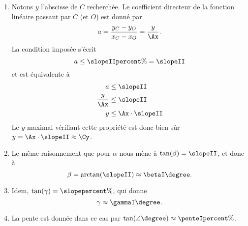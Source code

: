 {\begin{enumerate}
		\item 
		Notons $y$ l'abscisse de $C$ recherchée.
		Le coefficient directeur de la fonction linéaire passant par $C$ (et $O$) est donné par
			\[ a = \dfrac{y_C-y_O}{x_C-x_O} = \dfrac{y}{\Ax}. \]
		La condition imposée s'écrit
			\[ a \leq \slopeIIpercent\% = \slopeII \]
		et est équivalente à
			\begin{align*}
				a &\leq \slopeII \\
				\dfrac{y}{\Ax} &\leq \slopeII \\
				y &\leq \Ax \cdot \slopeII
			\end{align*}
		Le $y$ maximal vérifiant cette propriété est donc bien sûr $y=\Ax \cdot \slopeII \approx \Cy$.
		
		
		
		\item		
		Le même raisonnement que pour $\alpha$ nous mène à $\tan(\beta) = \slopeII$, et donc à
			\[ \beta = \arctan(\slopeII) \approx \betaI\degree. \]
			
		\item 
		Idem, $\tan(\gamma) = \slopepercent\%$, qui donne
			\[ \gamma \approx \gammaI\degree.\]
			
		\item 
		La pente est donnée dans ce cas par $\tan(\angle\degree) \approx \penteIpercent\%$.
	\end{enumerate}
	
%	 
%		

}

\ifsolutions
\else

